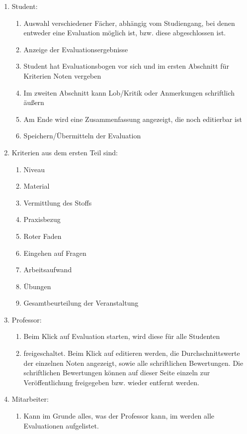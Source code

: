 \documentclass[titlepage, 12pt,a4paper]{scrartcl}
\begin{document}
\begin{enumerate}
\item Student: 
\begin{enumerate} 
\item Auswahl verschiedener Fächer, abhängig vom Studiengang, bei denen entweder eine Evaluation möglich ist, bzw. diese abgeschlossen ist.
\item Anzeige der Evaluationsergebnisse
\item Student hat Evaluationsbogen vor sich und im ersten Abschnitt für Kriterien Noten vergeben
\item Im zweiten Abschnitt kann Lob/Kritik oder Anmerkungen schriftlich äußern
\item Am Ende wird eine Zusammenfassung angezeigt, die noch editierbar ist
\item Speichern/Übermitteln der Evaluation 
\end{enumerate}

\item Kriterien aus dem ersten Teil sind:

\begin{enumerate}
\item Niveau
\item Material
\item Vermittlung des Stoffs
\item Praxisbezug
\item Roter Faden
\item Eingehen auf Fragen
\item Arbeitsaufwand
\item Übungen
\item Gesamtbeurteilung der Veranstaltung 
\end{enumerate}

\item Professor: 
\begin{enumerate}
\item Beim Klick auf Evaluation starten, wird diese für alle Studenten
\item freigeschaltet. Beim Klick auf editieren werden, 
die Durchschnittswerte der einzelnen Noten angezeigt, sowie alle
schriftlichen Bewertungen. Die schriftlichen Bewertungen können auf dieser
Seite einzeln zur Veröffentlichung freigegeben bzw. wieder entfernt werden.

\end{enumerate}

\item Mitarbeiter: 
\begin{enumerate}
\item Kann im Grunde alles, was der Professor kann, im werden alle Evaluationen
aufgelistet.
\end{enumerate}

\end{enumerate}
\end{document}
